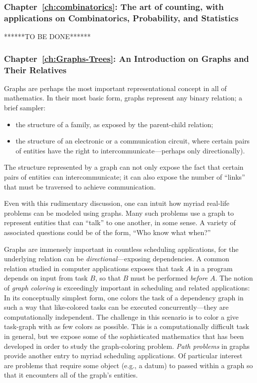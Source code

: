 \subsubsection{Chapter~\ref{ch:combinatorics}: 
The art of counting, with applications on
Combinatorics,
  Probability, and Statistics}

******TO BE DONE******

\subsubsection{Chapter~\ref{ch:Graphs-Trees}: An Introduction on Graphs and Their Relatives}

Graphs are perhaps the most important representational concept in all
of mathematics.  In their most basic form, graphs represent any binary
relation; a brief sampler:
\begin{itemize}
\item
the structure of a family, as exposed by the parent-child relation;
\item
the structure of an electronic or a communication circuit, where
certain pairs of entities have the right to intercommunicate---perhaps
only directionally).
\end{itemize}
The structure represented by a graph can not only expose the fact that
certain pairs of entities can intercommunicate; it can also expose the
number of ``links'' that must be traversed to achieve communication.

Even with this rudimentary discussion, one can intuit how myriad
real-life problems can be modeled using graphs.  Many such problems
use a graph to represent entities that can ``talk'' to one another, in
some sense.  A variety of associated questions could be of the form,
``Who know what when?''

Graphs are immensely important in countless scheduling applications,
for the underlying relation can be {\em directional}---exposing
dependencies.  A common relation studied in computer applications
exposes that task $A$ in a program depends on input from task $B$, so
that $B$ must be performed {\em before $A$}.  The notion of {\it graph
  coloring} is exceedingly important in scheduling and related
applications: In its conceptually simplest form, one colors the task
of a dependency graph in such a way that like-colored tasks can be
executed concurrently---they are computationally independent.  The
challenge in this scenario is to color a give task-graph with as few
colors as possible.  This is a computationally difficult task in
general, but we expose some of the sophisticated mathematics that has
been developed in order to study the graph-coloring problem.
{\em Path problems} in graphs provide another entry to myriad
scheduling applications.  Of particular interest are problems that
require some object (e.g., a datum) to passed within a graph so that
it encounters all of the graph's entities.


